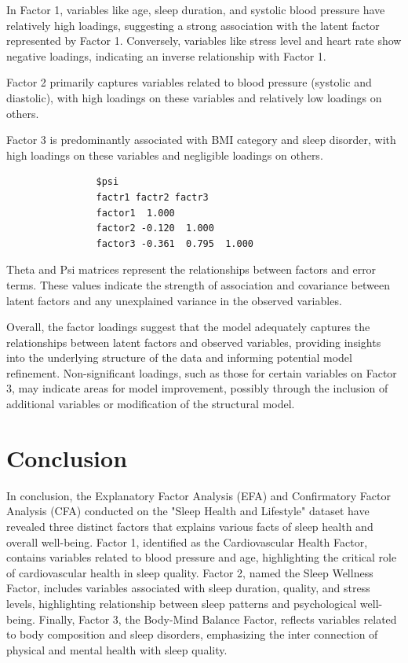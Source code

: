 \documentclass[11pt]{article}
\begin{document}
		In Factor 1, variables like age, sleep duration, and systolic blood pressure have relatively high loadings, suggesting a strong association with the latent factor represented by Factor 1. Conversely, variables like stress level and heart rate show negative loadings, indicating an inverse relationship with Factor 1.
		
		Factor 2 primarily captures variables related to blood pressure (systolic and diastolic), with high loadings on these variables and relatively low loadings on others.
		
		Factor 3 is predominantly associated with BMI category and sleep disorder, with high loadings on these variables and negligible loadings on others.
		
		\begin{tcolorbox}[colback=white,colframe=black]
			\begin{verbatim}				
				$psi
				factr1 factr2 factr3
				factor1  1.000              
				factor2 -0.120  1.000       
				factor3 -0.361  0.795  1.000
			\end{verbatim}
		\end{tcolorbox}
		
		Theta and Psi matrices represent the relationships between factors and error terms. These values indicate the strength of association and covariance between latent factors and any unexplained variance in the observed variables.
		
		Overall, the factor loadings suggest that the model adequately captures the relationships between latent factors and observed variables, providing insights into the underlying structure of the data and informing potential model refinement. Non-significant loadings, such as those for certain variables on Factor 3, may indicate areas for model improvement, possibly through the inclusion of additional variables or modification of the structural model.
		
		\section{Conclusion}
		In conclusion, the Explanatory Factor Analysis (EFA) and Confirmatory Factor Analysis (CFA) conducted on the "Sleep Health and Lifestyle" dataset have revealed three distinct factors that explains various facts of sleep health and overall well-being. Factor 1, identified as the Cardiovascular Health Factor, contains variables related to blood pressure and age, highlighting the critical role of cardiovascular health in sleep quality. Factor 2, named the Sleep Wellness Factor, includes variables associated with sleep duration, quality, and stress levels, highlighting relationship between sleep patterns and psychological well-being. Finally, Factor 3, the Body-Mind Balance Factor, reflects variables related to body composition and sleep disorders, emphasizing the inter connection of physical and mental health with sleep quality.
		
\end{document}
